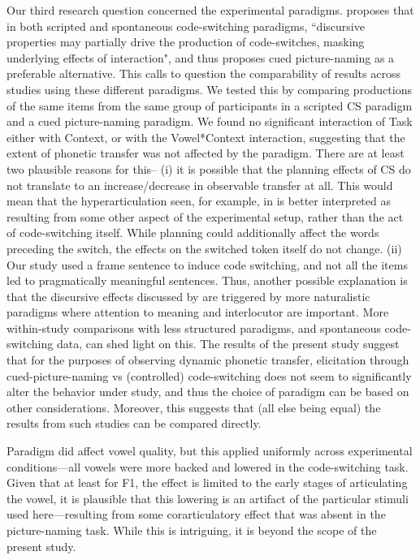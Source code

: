 \documentclass[charis,linguex]{glossa}
\begin{document}
Our third research question concerned the experimental paradigms. \cite{olson2013bilingual} proposes that in both scripted and spontaneous code-switching paradigms, ``discursive properties may partially drive the production of code-switches, masking underlying effects of interaction", and thus proposes cued picture-naming as a preferable alternative. This calls to question the comparability of results across studies using these different paradigms. We tested this by comparing productions of the same items from the same group of participants in a scripted CS paradigm and a cued picture-naming paradigm. We found no significant interaction of Task either with Context, or with the Vowel*Context interaction, suggesting that the extent of phonetic transfer was not affected by the paradigm. 
There are at least two plausible reasons for this-- (i) it is possible that the planning effects of CS do not translate to an increase/decrease in observable transfer at all. This would mean that the hyperarticulation seen, for example, in \cite{muldner2019phonetics} is better interpreted as resulting from some other aspect of the experimental setup, rather than the act of code-switching itself. While planning could additionally affect the words preceding the switch, the effects on the switched token itself do not change. (ii) Our study used a frame sentence to induce code switching, and not all the items led to pragmatically meaningful sentences. Thus, another possible explanation is that the discursive effects discussed by \cite{olson2013bilingual} are triggered by more naturalistic paradigms where attention to meaning and interlocutor are important. More within-study comparisons with less structured paradigms, and spontaneous code-switching data, can shed light on this. The results of the present study suggest that for the purposes of observing dynamic phonetic transfer, elicitation through cued-picture-naming vs (controlled) code-switching does not seem to significantly alter the behavior under study, and thus the choice of paradigm can be based on other considerations. Moreover, this suggests that (all else being equal) the results from such studies can be compared directly. 

Paradigm did affect vowel quality, but this applied uniformly across experimental conditions---all vowels were more backed and lowered in the code-switching task. Given that at least for F1, the effect is limited to the early stages of articulating the vowel, it is plausible that this lowering is an artifact of the particular stimuli used here---resulting from some corarticulatory effect that was absent in the picture-naming task. While this is intriguing, it is beyond the scope of the present study.  
\end{document}
